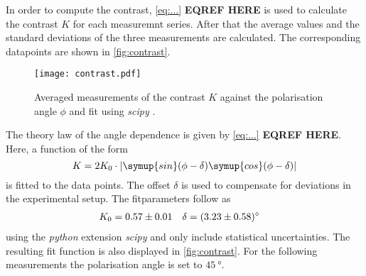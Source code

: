In order to compute the contrast, \autoref{eq:...} \textbf{EQREF HERE} is used to calculate the contrast 
$K$ for each measuremnt series. After that the average values and the standard deviations of the three measurements are calculated. The corresponding datapoints are shown in 
\autoref{fig:contrast}. 
\begin{figure}
  \centering
  \texttt{[image: contrast.pdf]}
  \caption{Averaged measurements of the contrast $K$ against the polarisation angle $\phi$ and fit using \textit{scipy} \cite{scipy}.}
  \label{fig:contrast}
\end{figure}
The theory law of the angle dependence is given by \autoref{eq:...} \textbf{EQREF HERE}. Here, a function of the form 
\begin{equation*}
  K = 2K_0 \cdot \lvert \symup{sin}(\phi - \delta)\symup{cos}(\phi - \delta) \rvert
\end{equation*}
is fitted to the data points. The offset $\delta$ is used to compensate for deviations in the experimental setup. 
The fitparameters follow as 
\begin{align*}
  K_0 &= \num{0.57 +- 0.01} & \delta &= \qty{3.23 +- 0.58}{\degree}
\end{align*}
using the \textit{python} extension \textit{scipy} \cite{scipy} and only include statistical uncertainties. The resulting fit function is also displayed in \autoref{fig:contrast}.
For the following measurements the polarisation angle is set to $\qty{45}{\degree}$.

